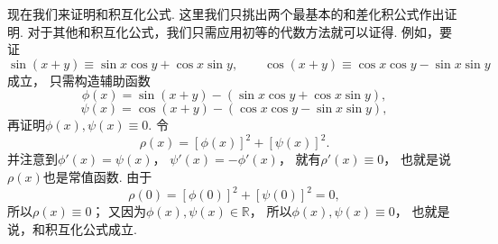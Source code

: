 现在我们来证明和积互化公式.
这里我们只挑出两个最基本的和差化积公式作出证明.
对于其他和积互化公式，我们只需应用初等的代数方法就可以证得.
例如，要证\begin{equation*}
\sin(x+y) \equiv \sin x \cos y + \cos x \sin y,
\qquad
\cos(x+y) \equiv \cos x \cos y - \sin x \sin y
\end{equation*}成立，
只需构造辅助函数\begin{equation*}
\phi(x)
= \sin(x+y) - (\sin x \cos y + \cos x \sin y),
\end{equation*}\begin{equation*}
\psi(x)
= \cos(x+y) - (\cos x \cos y - \sin x \sin y),
\end{equation*}再证明\(\phi(x),\psi(x) \equiv 0\).
令\begin{equation*}
\rho(x)
= [\phi(x)]^2 + [\psi(x)]^2.
\end{equation*}
并注意到\(\phi'(x) = \psi(x)\)，
\(\psi'(x) = -\phi'(x)\)，
就有\(\rho'(x) \equiv 0\)，
也就是说\(\rho(x)\)也是常值函数.
由于\begin{equation*}
\rho(0) = [\phi(0)]^2 + [\psi(0)]^2 = 0,
\end{equation*}
所以\(\rho(x) \equiv 0\)；
又因为\(\phi(x),\psi(x) \in \mathbb{R}\)，
所以\(\phi(x),\psi(x) \equiv 0\)，
也就是说，和积互化公式成立.
